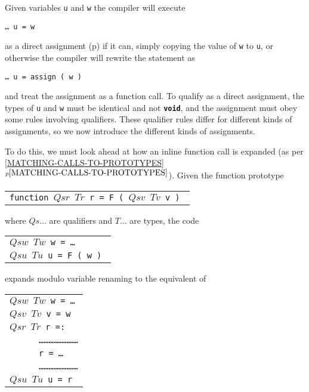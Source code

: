\documentclass[12pt]{article}
\newcommand{\TT}[1]{{\tt \bfseries #1}}
\newcommand{\itemref}[1]{\ref{#1}$^{p\pageref{#1}}$}
\newcommand{\pagref}[1]{p\pageref{#1}}
\begin{document}
Given variables {\tt u} and {\tt w}
the compiler will execute
\begin{center}
\tt \ldots~u = w
\end{center}
as a direct assignment (\pagref{DIRECT-ASSIGNMENT-TYPE}) if it can,
simply copying the value of {\tt w} to {\tt u}, or otherwise
the compiler will rewrite the statement as
\begin{center}
\tt \ldots~u = assign ( w )
\end{center}
and treat the assignment as a function call.  To qualify as a direct
assignment, the types of {\tt u} and {\tt w} must be identical and
not \TT{void},
and the assignment must obey some rules involving qualifiers.  These
qualifier rules differ for different kinds of assignments, so we
now introduce the different kinds of assignments.

To do this, we must look ahead at how
an inline function call is expanded (as per
\itemref{MATCHING-CALLS-TO-PROTOTYPES}).  Given the function
prototype
\begin{center}
\begin{tabular}{l}
\tt function $Qsr$ $Tr$ r = F ( $Qsv$ $Tv$ v ) \\
\end{tabular}
\end{center}
where $Qs\ldots$ are qualifiers and $T\ldots$ are types,
the code
\begin{center}
\begin{tabular}{l}
\tt $Qsw$ $Tw$ w = \ldots \\
\tt $Qsu$ $Tu$ u = F ( w ) \\
\end{tabular}
\end{center}
expands modulo variable renaming to the equivalent of
\begin{center}
\begin{tabular}{l}
\tt $Qsw$ $Tw$ w = \ldots \\
\tt $Qsv$ $Tv$ v = w \\

\tt $Qsr$ $Tr$ r =: \\
\tt ~~~~~ \ldots\ldots\ldots\ldots\ldots\ldots\ldots\ldots \\
\tt ~~~~~ r = \ldots \\
\tt ~~~~~ \ldots\ldots\ldots\ldots\ldots\ldots\ldots\ldots \\
\tt $Qsu$ $Tu$ u = r \\
\end{tabular}
\end{center}
\end{document}
